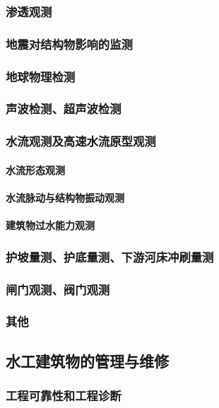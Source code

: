 \documentclass[UTF8]{../../ApplicationUniverse}
\begin{document}
        \subsubsection{渗透观测}
        \subsubsection{地震对结构物影响的监测}
        \subsubsection{地球物理检测}
        \subsubsection{声波检测、超声波检测}
        \subsubsection{水流观测及高速水流原型观测}
            \paragraph{水流形态观测}
            \paragraph{水流脉动与结构物振动观测}
            \paragraph{建筑物过水能力观测}
        \subsubsection{护坡量测、护底量测、下游河床冲刷量测}
        \subsubsection{闸门观测、阀门观测}
        \subsubsection{其他}
    \subsection{水工建筑物的管理与维修}
        \subsubsection{工程可靠性和工程诊断}
\end{document}
